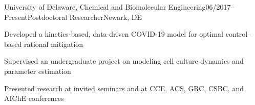 \begin{rSubsection}{University of Delaware, Chemical and Biomolecular Engineering}{06/2017--Present}{Postdoctoral Researcher}{Newark, DE}
\item Developed %
a kinetics-based, data-driven
COVID-19 %
model
for optimal control--based rational mitigation
\item Supervised an undergraduate project
on modeling cell culture dynamics and parameter estimation
\item Presented research
at invited %
seminars
and 
at CCE, ACS, GRC, CSBC, and AIChE conferences
%
%
%
%
%
%
\end{rSubsection}